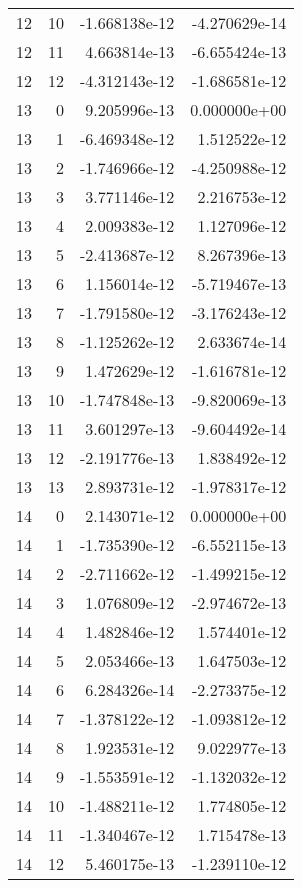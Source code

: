 \begin{tabular}{rrrr}
  12 &   10 & -1.668138e-12 & -4.270629e-14 \\
  12 &   11 &  4.663814e-13 & -6.655424e-13 \\
  12 &   12 & -4.312143e-12 & -1.686581e-12 \\
  13 &    0 &  9.205996e-13 &  0.000000e+00 \\
  13 &    1 & -6.469348e-12 &  1.512522e-12 \\
  13 &    2 & -1.746966e-12 & -4.250988e-12 \\
  13 &    3 &  3.771146e-12 &  2.216753e-12 \\
  13 &    4 &  2.009383e-12 &  1.127096e-12 \\
  13 &    5 & -2.413687e-12 &  8.267396e-13 \\
  13 &    6 &  1.156014e-12 & -5.719467e-13 \\
  13 &    7 & -1.791580e-12 & -3.176243e-12 \\
  13 &    8 & -1.125262e-12 &  2.633674e-14 \\
  13 &    9 &  1.472629e-12 & -1.616781e-12 \\
  13 &   10 & -1.747848e-13 & -9.820069e-13 \\
  13 &   11 &  3.601297e-13 & -9.604492e-14 \\
  13 &   12 & -2.191776e-13 &  1.838492e-12 \\
  13 &   13 &  2.893731e-12 & -1.978317e-12 \\
  14 &    0 &  2.143071e-12 &  0.000000e+00 \\
  14 &    1 & -1.735390e-12 & -6.552115e-13 \\
  14 &    2 & -2.711662e-12 & -1.499215e-12 \\
  14 &    3 &  1.076809e-12 & -2.974672e-13 \\
  14 &    4 &  1.482846e-12 &  1.574401e-12 \\
  14 &    5 &  2.053466e-13 &  1.647503e-12 \\
  14 &    6 &  6.284326e-14 & -2.273375e-12 \\
  14 &    7 & -1.378122e-12 & -1.093812e-12 \\
  14 &    8 &  1.923531e-12 &  9.022977e-13 \\
  14 &    9 & -1.553591e-12 & -1.132032e-12 \\
  14 &   10 & -1.488211e-12 &  1.774805e-12 \\
  14 &   11 & -1.340467e-12 &  1.715478e-13 \\
  14 &   12 &  5.460175e-13 & -1.239110e-12 \\

\end{tabular}
